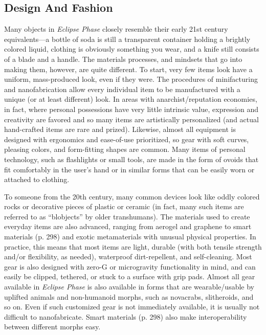 \subsection{Design And Fashion}

Many objects in \textit{Eclipse Phase} closely resemble their 
early 21st century equivalents—a bottle of soda is still 
a transparent container holding a brightly colored 
liquid, clothing is obviously something you wear, and 
a knife still consists of a blade and a handle. The materials
processes, and mindsets that go into making
them, however, are quite different. To start, very few 
items look have a uniform, mass-produced look, even 
if they were. The procedures of minifacturing and 
nanofabrication allow every individual item to be 
manufactured with a unique (or at least different) 
look. In areas with anarchist/reputation economies, in 
fact, where personal possessions have very little intrinsic
value, expression and creativity are favored and so
many items are artistically personalized (and actual 
hand-crafted items are rare and prized). Likewise, 
almost all equipment is designed with ergonomics 
and ease-of-use prioritized, so gear with soft curves, 
pleasing colors, and form-fitting shapes are common. 
Many items of personal technology, such as flashlights 
or small tools, are made in the form of ovoids that 
fit comfortably in the user's hand or in similar forms 
that can be easily worn or attached to clothing.

To 
someone from the 20th century, many common 
devices look like oddly colored rocks or decorative 
pieces of plastic or ceramic (in fact, many such items 
are referred to as ``blobjects'' by older transhumans).
The materials used to create everyday items are 
also advanced, ranging from aerogel and graphene 
to smart materials (p. 298) and exotic metamaterials
with unusual physical properties. In practice, this
means that most items are light, durable (with both 
tensile strength and/or flexibility, as needed), waterproof
dirt-repellent, and self-cleaning. Most gear is
also designed with zero-G or microgravity functionality
in mind, and can easily be clipped, tethered, or
stuck to a surface with grip pads.
Almost all gear available in \textit{Eclipse Phase} is also 
available in forms that are wearable/usable by uplifted
animals and non-humanoid morphs, such
as novacrabs, slitheroids, and so on. Even if such 
customized gear is not immediately available, it is 
usually not difficult to nanofabricate. Smart materials 
(p. 298) also make interoperability between different 
morphs easy.

